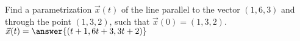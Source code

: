 \begin{problem}
Find a parametrization $\vec{x}(t)$ of the line parallel to the vector $(1,6,3)$ and through the point $(1,3,2)$, such that $\vec{x}(0) = (1,3,2)$.
$\vec{x}(t) = \answer{(t+1,6t+3,3t+2)}$
\end{problem}